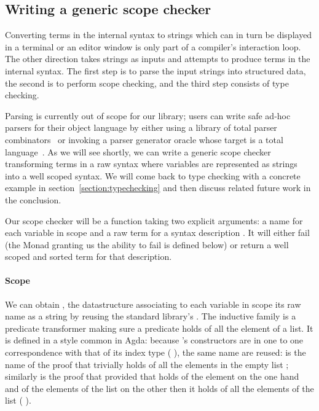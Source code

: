 \subsection{Writing a generic scope checker}\label{section:genericscoping}

Converting terms in the internal syntax to strings which can in turn be
displayed in a terminal or an editor window is only part of a compiler's
interaction loop. The other direction takes strings as inputs and attempts to
produce terms in the internal syntax. The first step is to parse the input
strings into structured data, the second is to perform scope checking,
and the third step consists of type checking.

Parsing is currently out of scope for our library; users can write safe
ad-hoc parsers for their object language by either using a library of total
parser combinators~\cite{DBLP:conf/icfp/Danielsson10,allais2018agdarsec}
or invoking a parser generator oracle whose target is a total
language~\cite{Stump:2016:VFP:2841316}. As we will see shortly, we can
write a generic scope checker transforming terms in a raw syntax where
variables are represented as strings into a well scoped syntax. We will
come back to type checking with a concrete example in section~\ref{section:typechecking}
and then discuss related future work in the conclusion.

Our scope checker will be a function taking two explicit arguments: a
name for each variable in scope  and a raw term for a syntax
description .  It will either fail (the Monad  granting
us the ability to fail is defined below) or return a well scoped and
sorted term for that description.

\begin{agdasnippet}
\end{agdasnippet}

\paragraph*{Scope} We can obtain , the datastructure associating to
each variable in scope its raw name as a string by reusing the standard library's
. The inductive family  is a predicate transformer making sure a
predicate holds of all the element of a list. It is defined in a style common in
Agda: because 's constructors are in one to one correspondence with that
of its index type ( ), the same name are reused: \AIC{[]} is the
name of the proof that  trivially holds of all the elements in the empty
list \AIC{[]}; similarly  is the proof that provided that  holds
of the element  on the one hand and of the elements of the list 
on the other then it holds of all the elements of the list (  ).


